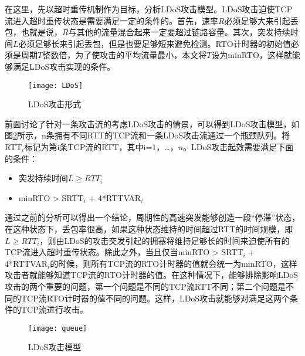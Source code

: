 在这里，先以超时重传机制作为目标，分析LDoS攻击模型。LDoS攻击迫使TCP流进入超时重传状态是需要满足一定的条件的。首先，速率$R$必须足够大来引起丢包，也就是说，$R$与其他的流量混合起来一定要超过链路容量。其次，突发持续时间$L$必须足够长来引起丢包，但是也要足够短来避免检测。RTO计时器的初始值必须是周期$T$整数倍，为了使攻击的平均流量最小，本文将$T$设为minRTO，这样就能够满足LDoS攻击实现的条件。

\begin{figure}
    \centering
    \texttt{[image: LDoS]}
    \caption{LDoS攻击形式}
    \label{fig:LDoS}
\end{figure}

前面讨论了针对一条攻击流的考虑LDoS攻击的情景，可以得到LDoS攻击模型，如图\ref{fig:model}所示，n条拥有不同RTT的TCP流和一条LDoS攻击流通过一个瓶颈队列。将RTT$_{i}$标记为第i条TCP流的RTT，其中i=1，…，$n$。LDoS攻击起效需要满足下面的条件：
\begin{itemize}
    \item 突发持续时间$L \geq RTT_i $
    \item minRTO > SRTT$_i$ + 4*RTTVAR$_i$
\end{itemize}

通过之前的分析可以得出一个结论，周期性的高速突发能够创造一段“停滞”状态，在这种状态下，丢包率很高，如果这种状态维持的时间超过RTT的时间规模，即$L \geq RTT_i$，则由LDoS的攻击突发引起的拥塞将维持足够长的时间来迫使所有的TCP流进入超时重传状态。除此之外，当且仅当minRTO > SRTT$_i$ + 4*RTTVAR$_i$的时候，则所有TCP流的RTO计时器的值就会统一为minRTO，这样攻击者就能够知道TCP流的RTO计时器的值。在这种情况下，能够排除影响LDoS攻击的两个重要的问题，第一个问题是不同的TCP流RTT不同；第二个问题是不同的TCP流RTO计时器的值不同的问题。这样，LDoS攻击就能够对满足这两个条件的TCP流进行攻击。





\begin{figure}
    \centering
    \texttt{[image: queue]}
    \caption{LDoS攻击模型}
    \label{fig:model}
\end{figure}

